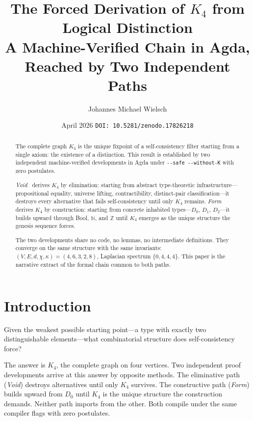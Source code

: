 \documentclass[11pt,a4paper]{article}
\title{The Forced Derivation of $K_4$ from Logical Distinction\\[0.3em]
\large A Machine-Verified Chain in Agda, Reached by Two Independent Paths}
\author{Johannes Michael Wielsch}
\date{April 2026 \quad\texttt{DOI: 10.5281/zenodo.17826218}}
\theoremstyle{definition}
\begin{document}
\maketitle

\begin{abstract}
\noindent
The complete graph $K_4$ is the unique fixpoint of a self-consistency filter
starting from a single axiom: the existence of a distinction.  This result
is established by two independent machine-verified developments in Agda under
\texttt{-{}-safe -{}-without-K} with zero postulates.

\textit{Void}~\cite{wielsch2026void} derives $K_4$ by elimination: starting
from abstract type-theoretic infrastructure---propositional equality, universe
lifting, contractibility, distinct-pair classification---it destroys every
alternative that fails self-consistency until only $K_4$ remains.
\textit{Form}~\cite{wielsch2026form} derives $K_4$ by construction: starting
from concrete inhabited types---$D_0$, $D_1$, $D_2$---it builds upward
through Bool, $\mathbb{N}$, and $\mathbb{Z}$ until $K_4$ emerges as the
unique structure the genesis sequence forces.

The two developments share no code, no lemmas, no intermediate definitions.
They converge on the same structure with the same invariants:
$(V,E,d,\chi,\kappa) = (4,6,3,2,8)$, Laplacian spectrum $\{0,4,4,4\}$.
This paper is the narrative extract of the formal chain common to both paths.
\end{abstract}

\section{Introduction}
\label{sec:intro}

Given the weakest possible starting point---a type with exactly two
distinguishable elements---what combinatorial structure does self-consistency
force?

The answer is $K_4$, the complete graph on four vertices.  Two independent
proof developments arrive at this answer by opposite methods.  The
eliminative path (\textit{Void}) destroys alternatives until only $K_4$
survives.  The constructive path (\textit{Form}) builds upward from $D_0$
until $K_4$ is the unique structure the construction demands.  Neither path
imports from the other.  Both compile under the same compiler flags with
zero postulates.
\end{document}
